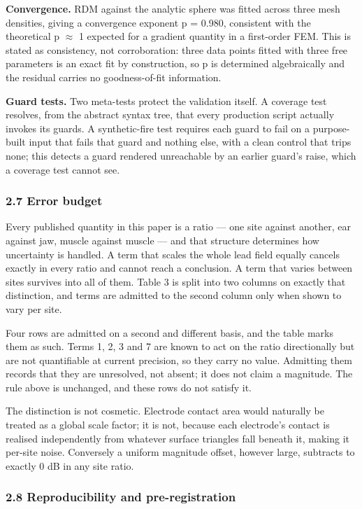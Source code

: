 \documentclass[
  11pt,
  letterpaper,
]{article}
\newcounter{none} %
\begin{document}
\textbf{Convergence.} RDM against the analytic sphere was fitted across three mesh
densities, giving a convergence exponent p = 0.980, consistent with the
theoretical p $\approx$ 1 expected for a gradient quantity in a first-order FEM. This is
stated as consistency, not corroboration: three data points fitted with three
free parameters is an exact fit by construction, so p is determined
algebraically and the residual carries no goodness-of-fit information.

\textbf{Guard tests.} Two meta-tests protect the validation itself. A coverage test
resolves, from the abstract syntax tree, that every production script actually
invokes its guards. A synthetic-fire test requires each guard to fail on a
purpose-built input that fails that guard and nothing else, with a clean control
that trips none; this detects a guard rendered unreachable by an earlier guard's
raise, which a coverage test cannot see.

\subsubsection{2.7 Error budget}\label{error-budget}

Every published quantity in this paper is a ratio --- one site against another,
ear against jaw, muscle against muscle --- and that structure determines how
uncertainty is handled. A term that scales the whole lead field equally cancels
exactly in every ratio and cannot reach a conclusion. A term that varies between
sites survives into all of them. Table 3 is split into two columns on exactly
that distinction, and terms are admitted to the second column only when shown to
vary per site.

Four rows are admitted on a second and different basis, and the table marks them
as such. Terms 1, 2, 3 and 7 are known to act on the ratio directionally but are
not quantifiable at current precision, so they carry no value. Admitting them
records that they are unresolved, not absent; it does not claim a
magnitude. The rule above is unchanged, and these rows do not satisfy it.

The distinction is not cosmetic. Electrode contact area would naturally be
treated as a global scale factor; it is not, because each electrode's contact is
realised independently from whatever surface triangles fall beneath it, making
it per-site noise. Conversely a uniform magnitude offset, however large,
subtracts to exactly 0 dB in any site ratio.

\subsubsection{2.8 Reproducibility and pre-registration}\label{reproducibility-and-pre-registration}
\end{document}

